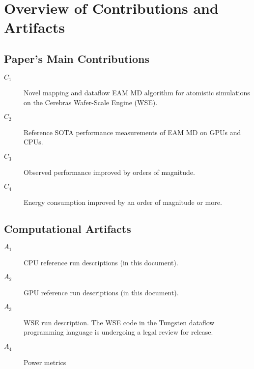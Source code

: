\documentclass[conference]{IEEEtran}
\begin{document}
\newcommand{\gitrepo}{\texttt{https://github.com/CerebrasResearch/ Cerebras-Trilabs}}



\appendixAD

\section{Overview of Contributions and Artifacts}

\subsection{Paper's Main Contributions}

\begin{description}
\item[$C_1$] Novel mapping and dataflow EAM MD algorithm for atomistic simulations on the Cerebras Wafer-Scale Engine (WSE).
\item[$C_2$] Reference SOTA performance measurements of EAM MD on GPUs and CPUs.
\item[$C_3$] Observed performance improved by orders of magnitude.
\item[$C_4$] Energy consumption improved by an order of magnitude or more.
\end{description}

\subsection{Computational Artifacts}

\begin{description}
\item[$A_1$] CPU reference run descriptions (in this document).
\item[$A_2$] GPU reference run descriptions (in this document).
\item[$A_3$] WSE run description. The WSE code in the Tungsten dataflow programming language is undergoing a legal review for release.
\item[$A_4$] Power metrics
\end{description}
\end{document}
